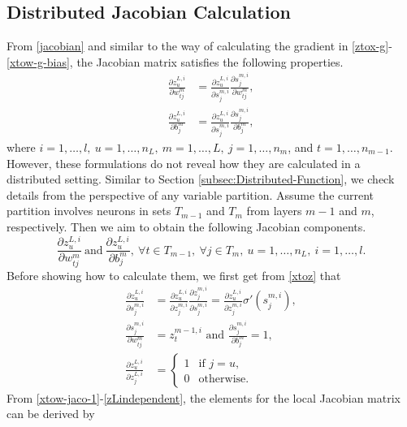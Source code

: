 \documentclass[12pt]{article}
\begin{document}
\subsection{Distributed Jacobian Calculation}
\label{subsec:Distributed-Jacobian}
From \eqref{jacobian} and similar to the way of calculating the gradient in \eqref{ztox-g}-\eqref{xtow-g-bias}, the Jacobian matrix
satisfies the following properties.
\begin{align}
\frac{\partial z^{L,i}_u}{\partial w^m_{tj}} &= \frac{\partial z^{L,i}_u}{\partial s^{m,i}_j} \frac{\partial s^{m,i}_j}{\partial w^m_{tj}}, \label{xtow-jaco-1}\\
\frac{\partial z^{L,i}_u}{\partial b^m_{j}}  &= \frac{\partial z^{L,i}_u}{\partial s^{m,i}_j} \frac{\partial s^{m,i}_j}{\partial b^m_j}, \label{xtow-jaco-bias-1}
\end{align}
where $i=1,\ldots,l,\ u=1,\ldots,n_L,\ m=1,\ldots,L,\ j=1,\ldots,n_m$, and $t=1,\ldots,n_{m-1}$.
However, these formulations do not reveal how they are calculated in a distributed setting. Similar to Section \ref{subsec:Distributed-Function}, we check details from the 
perspective of any variable partition.
Assume the current partition involves neurons in sets $T_{m-1}$ and $T_{m}$ from layers $m-1$ and $m$, respectively. 
Then we aim to obtain the following Jacobian components.
\begin{equation*}
\frac{\partial z^{L,i}_u}{\partial w^m_{tj}}\ \text{and}\ \frac{\partial z^{L,i}_u}{\partial b^m_j},\ \forall t \in T_{m-1},\ 
\forall j \in T_m,\ u=1,\ldots,n_L,\ i=1,\ldots,l.
\end{equation*}
Before showing how to calculate them, we first get from \eqref{xtoz} that
\begin{align}
 \frac{\partial z^{L,i}_u}{\partial s^{m,i}_j} &= \frac{\partial z^{L,i}_u}{\partial z^{m,i}_j} \frac{\partial z^{m,i}_j}{\partial s^{m,i}_j} =\frac{\partial z^{L,i}_u}{\partial z^{m,i}_j}\sigma' (s^{m,i}_j), \label{ztox-jaco} \\
\frac{\partial s^{m,i}_j}{\partial w^m_{tj}} &= z^{m-1,i}_t \text{ and } \frac{\partial s^{m,i}_j}{\partial b^m_j} = 1 \label{stow-jaco}, \\
\frac{\partial z^{L,i}_u}{\partial z^{L,i}_j} &=
\begin{cases}
1 & \text{if } j = u, \\
0 & \text{otherwise.}
\end{cases}
\label{zLindependent}
\end{align}
From \eqref{xtow-jaco-1}-\eqref{zLindependent}, the elements for the local Jacobian matrix can be derived by
\end{document}
